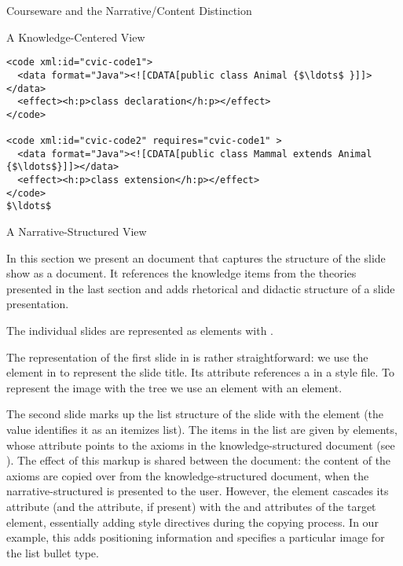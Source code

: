 \begin{omgroup}[id=courseware]{Courseware and the Narrative/Content Distinction}
\begin{omgroup}[id=courseware.knowledge-centered]{A Knowledge-Centered View}
\begin{lstlisting}[label=lst:cvi-code,mathescape,
    caption={{\omdoc} Representation of Program Code},
    index={code,data,CDATA,effect}]
<code xml:id="cvic-code1">
  <data format="Java"><![CDATA[public class Animal {$\ldots$ }]]></data>
  <effect><h:p>class declaration</h:p></effect>
</code>

<code xml:id="cvic-code2" requires="cvic-code1" >
  <data format="Java"><![CDATA[public class Mammal extends Animal {$\ldots$}]]></data>
  <effect><h:p>class extension</h:p></effect>
</code>
$\ldots$
\end{lstlisting}
\end{omgroup}

\begin{omgroup}[id=courseware.narrative-structured]{A Narrative-Structured View}

In this section we present an {\omdoc} document that captures the structure of the
slide show as a document. It references the knowledge items from the theories
presented in the last section and adds rhetorical and didactic structure of a
slide presentation.

The individual slides are represented as {} elements with
{} {}.

The representation of the first slide in {} is rather straightforward: we
use the {} element in {} to represent the
slide title.  Its {} attribute references a
 in a style file. To
represent the image with the {} tree we use an {}
element with an {} element.

The second slide marks up the list structure of the slide with the
{} element (the value {}
identifies it as an itemizes list). The items in the list are given by
{} elements, whose {} attribute points to the
axioms in the knowledge-structured document (see {}). The effect
of this markup is shared between the document: the content of the axioms are
copied over from the knowledge-structured document, when the narrative-structured
is presented to the user. However, the {} element cascades its
{} attribute (and the {} attribute, if
present) with the {} and {} attributes
of the target element, essentially adding style directives during the copying
process. In our example, this adds positioning information and specifies a
particular image for the list bullet type.


\end{omgroup}
\end{omgroup}
